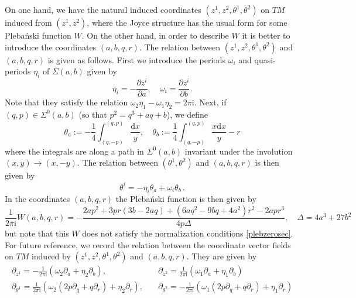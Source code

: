 \documentclass{article}
\theoremstyle{definition}
\numberwithin{equation}{section}
\begin{document}
On one hand, we have the natural induced coordinates $(z^1,z^2,\theta^1,\theta^2)$ on $TM$ induced from $(z^1,z^2)$, where the Joyce structure has the usual form for some Pleba\'nski function $W$. On the other hand,  in order to describe $W$ it is better to introduce the coordinates $(a,b,q,r)$. The relation between $(z^1,z^2,\theta^1,\theta^2)$ and $(a,b,q,r)$ is given as follows. First we introduce the periods $\omega_i$ and quasi-periods $\eta_i$ of $\Sigma(a,b)$ given by 
\begin{equation*}
\eta_i=-\frac{\partial z^i}{\partial a}, \quad \omega_i=\frac{\partial z^i}{\partial b}.
\end{equation*}
Note that they satisfy the relation $\omega_2\eta_1-\omega_1\eta_2=2\pi \mathrm{i}$. Next, if $(q,p)\in \Sigma^{0}(a,b)$ (so that $p^2=q^3+aq+b$), we define
\begin{equation*}
\theta_a:=-\frac{1}{4}\int_{(q,-p)}^{(q,p)}\frac{\mathrm{d}x}{y}, \quad \theta_b:=\frac{1}{4}\int_{(q,-p)}^{(q,p)}\frac{x\mathrm{d}x}{y}-r
\end{equation*}
where the integrals are along a path in $\Sigma^0(a,b)$ invariant under the involution $(x,y)\to (x,-y)$. The relation between $(\theta^1,\theta^2)$ and $(a,b,q,r)$ is then given by
\begin{equation*}
    \theta^i=-\eta_i\theta_a+\omega_i\theta_b\,.
\end{equation*}
 In the coordinates $(a,b,q,r)$ the Pleba\'nski function is then given by
\begin{equation}\label{A2pleb}
    \frac{1}{2\pi \mathrm{i}}W(a,b,q,r)=-\frac{2ap^2 +3pr(3b-2aq) + (6aq^2-9bq+4a^2)r^2 -2apr^3}{4p \Delta}, \quad \Delta=4a^3+27b^2
\end{equation}
but note that this $W$ does not satisfy the normalization conditions \eqref{plebzerosec}. For future reference, we record the relation between the coordinate vector fields on $TM$ induced by $(z^1,z^2,\theta^1,\theta^2)$ and $(a,b,q,r)$. They are given by 
\begin{equation}
\begin{split}
    \partial_{z^1}=-\frac{1}{2\pi \mathrm{i}}\left(\omega_2\partial_{a}+\eta_2\partial_b\right),& \quad \partial_{z^2}=\frac{1}{2\pi \mathrm{i}}\left(\omega_1\partial_{a}+\eta_1\partial_b\right)\\
    \partial_{\theta^1}=\frac{1}{2\pi \mathrm{i}}\left(\omega_2\left(2p \partial_q + q\partial_r\right)+\eta_2\partial_r\right), & \quad \partial_{\theta^2}=-\frac{1}{2\pi \mathrm{i}}\left(\omega_1\left(2p \partial_q + q\partial_r\right)+\eta_1\partial_r\right)\\
\end{split}
\end{equation}
\end{document}
